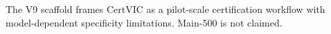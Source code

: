 The V9 scaffold frames CertVIC as a pilot-scale certification workflow with model-dependent specificity limitations. Main-500 is not claimed.
